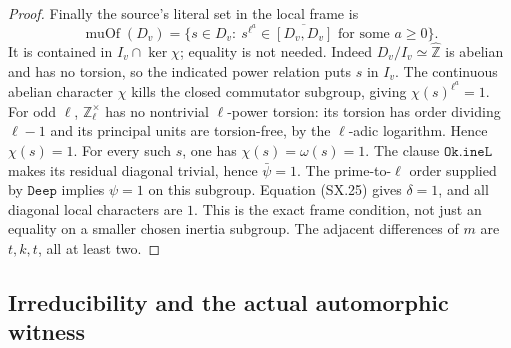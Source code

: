 \begin{proof}
Finally the source's literal set in the local frame is
\[
 \operatorname{muOf}(D_v)=
 \{s\in D_v:\ s^{\ell^a}\in
       \overline{[D_v,D_v]}\text{ for some }a\ge0\}.
\]
It is contained in $I_v\cap\ker\chi$; equality is not needed.
Indeed $D_v/I_v\simeq\widehat{\mathbb Z}$ is abelian and has
no torsion, so the indicated power relation puts $s$ in $I_v$.
The continuous abelian character $\chi$ kills the closed
commutator subgroup, giving $\chi(s)^{\ell^a}=1$.
For odd $\ell$, $\mathbb Z_\ell^\times$ has no nontrivial
$\ell$-power torsion: its torsion has order dividing $\ell-1$
and its principal units are torsion-free, by the $\ell$-adic
logarithm.  Hence $\chi(s)=1$.
For every such $s$, one has $\chi(s)=\omega(s)=1$.  The clause
$\texttt{Ok.ineL}$ makes its residual diagonal trivial, hence
$\bar\psi=1$.  The prime-to-$\ell$ order supplied by
$\texttt{Deep}$ implies $\psi=1$ on this subgroup.
Equation (SX.25) gives $\delta=1$, and all diagonal local
characters are $1$.  This is the exact frame condition, not just
an equality on a smaller chosen inertia subgroup.
The adjacent differences of $m$ are $t,k,t$, all at least two.
\end{proof}

\subsection{Irreducibility and the actual automorphic witness}

